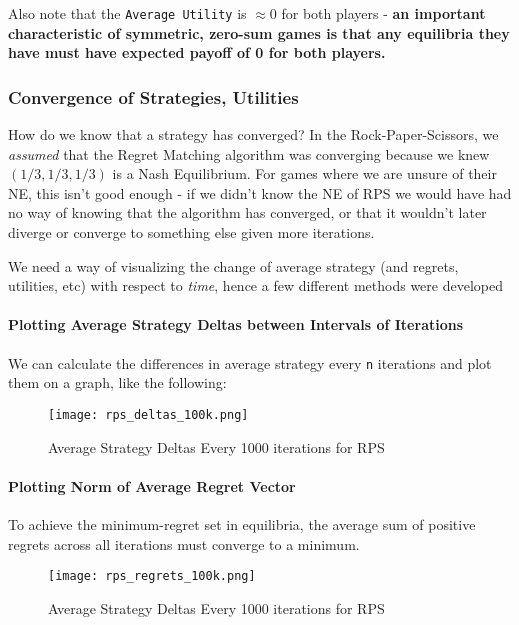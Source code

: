\documentclass [11pt]{article}
\begin{document}
Also note that the \texttt{Average Utility} is $\approx 0$ for both players - \textbf{an important characteristic of symmetric, zero-sum games is that any equilibria they have must have expected payoff of 0 for both players.}

\subsubsection{Convergence of Strategies, Utilities}

How do we know that a strategy has converged? In the Rock-Paper-Scissors, we \textit{assumed} that the Regret Matching algorithm was converging because we knew $(1/3, 1/3, 1/3)$ is a Nash Equilibrium. For games where we are unsure of their NE, this isn't good enough - if we didn't know the NE of RPS we would have had no way of knowing that the algorithm has converged, or that it wouldn't later diverge or converge to something else given more iterations.

We need a way of visualizing the change of average strategy (and regrets, utilities, etc) with respect to \textit{time}, hence a few different methods were developed

\paragraph{Plotting Average Strategy Deltas between Intervals of Iterations}

We can calculate the differences in average strategy every \texttt{n} iterations and plot them on a graph, like the following:

\begin{figure}[H]
  \centering
  \texttt{[image: rps\_deltas\_100k.png]}
  \caption{Average Strategy Deltas Every 1000 iterations for RPS}
\end{figure}

\paragraph{Plotting Norm of Average Regret Vector}

To achieve the minimum-regret set in equilibria, the average sum of positive regrets across all iterations must converge to a minimum.

\begin{figure}[H]
  \centering
  \texttt{[image: rps\_regrets\_100k.png]}
  \caption{Average Strategy Deltas Every 1000 iterations for RPS}
\end{figure}
\end{document}

